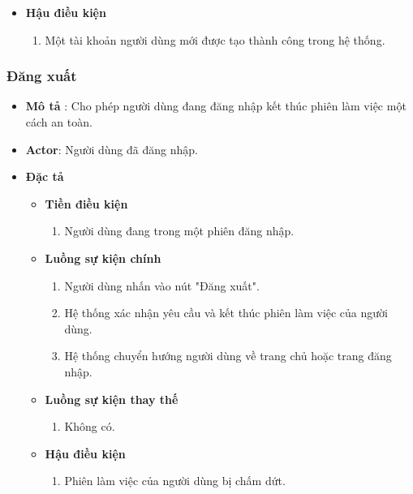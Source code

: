 \documentclass[../DoAn.tex]{subfiles}
\begin{document}
\begin{itemize}
\begin{itemize}
\begin{enumerate}
			            \item Nếu người dùng bỏ trống các trường thông tin bắt buộc, hệ thống sẽ yêu cầu nhập đầy đủ.
		            \end{enumerate}
		      \item \textbf{Hậu điều kiện}
		            \begin{enumerate}
			            \item Một tài khoản người dùng mới được tạo thành công trong hệ thống.
		            \end{enumerate}
	      \end{itemize}
\end{itemize}
\subsubsection{Đăng xuất}
\begin{itemize}
	\item \textbf{Mô tả} : Cho phép người dùng đang đăng nhập kết thúc phiên làm việc một cách an toàn.
	\item \textbf{Actor}: Người dùng đã đăng nhập.
	\item \textbf{Đặc tả}
	      \begin{itemize}
		      \item \textbf{Tiền điều kiện}
		            \begin{enumerate}
			            \item Người dùng đang trong một phiên đăng nhập.
		            \end{enumerate}
		      \item \textbf{Luồng sự kiện chính}
		            \begin{enumerate}
			            \item Người dùng nhấn vào nút "Đăng xuất".
			            \item Hệ thống xác nhận yêu cầu và kết thúc phiên làm việc của người dùng.
			            \item Hệ thống chuyển hướng người dùng về trang chủ hoặc trang đăng nhập.
		            \end{enumerate}
		      \item \textbf{Luồng sự kiện thay thế}
		            \begin{enumerate}
			            \item Không có.
		            \end{enumerate}
		      \item \textbf{Hậu điều kiện}
		            \begin{enumerate}
			            \item Phiên làm việc của người dùng bị chấm dứt.
		            \end{enumerate}
	      \end{itemize}
\end{itemize}
\end{document}
